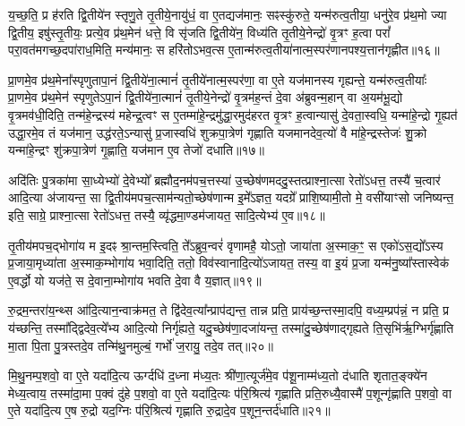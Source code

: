 य॒च्छ॒ति॒ प्र ह॑रति द्वि॒तीये॑न स्तृणु॒ते तृ॒तीये॒नायु॑धं॒ वा ए॒तद्यज॑मानः॒ सꣴस्कु॑रुते॒ यन्म॑रुत्व॒तीया॒ धनु॑रे॒व प्र॑थ॒मो ज्या द्वि॒तीय॒ इषु॑स्तृ॒तीयः॒ प्रत्ये॒व प्र॑थ॒मेन॑ धत्ते॒ वि सृ॑जति द्वि॒तीये॑न॒ विध्य॑ति तृ॒तीये॒नेन्द्रो॑ वृ॒त्रꣳ ह॒त्वा परां᳚ परा॒वत॑मगच्छ॒दपा॑राध॒मिति॒ मन्य॑मानः॒ स हरि॑तो\-ऽभव॒त्स ए॒तान्म॑रुत्व॒तीया॑नात्म॒स्पर॑णानपश्य॒त्तान॑गृह्णीत॥१६॥

प्रा॒णमे॒व प्र॑थ॒मेना᳚स्पृणुतापा॒नं द्वि॒तीये॑ना॒त्मानं॑ तृ॒तीये॑नात्म॒स्पर॑णा॒ वा ए॒ते यज॑मानस्य गृह्यन्ते॒ यन्म॑रुत्व॒तीयाः᳚ प्रा॒णमे॒व प्र॑थ॒मेन॑ स्पृणुते\-ऽपा॒नं द्वि॒तीये॑ना॒त्मानं॑ तृ॒तीये॒नेन्द्रो॑ वृ॒त्रम॑ह॒न्तं दे॒वा अ॑ब्रुवन्म॒हान् वा अ॒यम॑भू॒द्यो वृ॒त्रमव॑धी॒दिति॒ तन्म॑हे॒न्द्रस्य॑ महेन्द्र॒त्वꣳ स ए॒तम्मा॑हे॒न्द्रमु॑द्धा॒रमुद॑हरत वृ॒त्रꣳ ह॒त्वान्यासु॑ दे॒वता॒स्वधि॒ यन्मा॑हे॒न्द्रो गृ॒ह्यत॑ उद्धा॒रमे॒व तं यज॑मान॒ उद्ध॑रते॒\-ऽन्यासु॑ प्र॒जास्वधि॑ शुक्रपा॒त्रेण॑ गृह्णाति यजमानदेव॒त्यो॑ वै मा॑हे॒न्द्रस्तेजः॑ शु॒क्रो यन्मा॑हे॒न्द्रꣳ शु॑क्रपा॒त्रेण॑ गृ॒ह्णाति॒ यज॑मान ए॒व तेजो॑ दधाति॥१७॥

{\anuvakamend[{प्र॒थ॒मेना॑गृह्णीत दे॒वता᳚स्व॒ष्टाविꣳ॑शतिश्च॥५॥}]}

अदि॑तिः पु॒त्रका॑मा सा॒ध्येभ्यो॑ दे॒वेभ्यो᳚ ब्रह्मौद॒नम॑पच॒त्तस्या॑ उ॒च्छेष॑णमददु॒स्तत्प्राश्ना॒त्सा रेतो॑\-ऽधत्त॒ तस्यै॑ च॒त्वार॑ आदि॒त्या अ॑जायन्त॒ सा द्वि॒तीय॑मपच॒त्साम॑न्यतो॒च्छेष॑णान्म इ॒मे᳚\-ऽज्ञत॒ यदग्रे᳚ प्राशि॒ष्यामी॒तो मे॒ वसी॑याꣳसो जनिष्यन्त॒ इति॒ साग्रे॒ प्राश्ना॒त्सा रेतो॑\-ऽधत्त॒ तस्यै॒ व्यृ॑द्धमा॒ण्डम॑जायत॒ सादि॒त्येभ्य॑ ए॒व॥१८॥

तृ॒तीय॑मपच॒द्भोगा॑य म इ॒दꣴ श्रा॒न्तम॒स्त्विति॒ ते᳚\-ऽब्रुव॒न्वरं॑ वृणामहै॒ यो\-ऽतो॒ जाया॑ता अ॒स्माक॒ꣳ॒ स एको॑\-ऽस॒द्यो᳚\-ऽस्य प्र॒जाया॒मृध्या॑ता अ॒स्माक॒म्भोगा॑य भवा॒दिति॒ ततो॒ विव॑स्वानादि॒त्यो॑\-ऽजायत॒ तस्य॒ वा इ॒यं प्र॒जा यन्म॑नु॒ष्या᳚स्तास्वेक॑ ए॒वर्द्धो यो यज॑ते॒ स दे॒वाना॒म्भोगा॑य भवति दे॒वा वै य॒ज्ञात्॥१९॥

रु॒द्रम॒न्तरा॑य॒न्थ्स आ॑दि॒त्यान॒न्वाक्र॑मत॒ ते द्वि॑देव॒त्या᳚न्प्राप॑द्यन्त॒ तान्न प्रति॒ प्राय॑च्छ॒न्तस्मा॒दपि॒ वध्य॒म्प्रप॑न्नं॒ न प्रति॒ प्र य॑च्छन्ति॒ तस्मा᳚द्द्विदेव॒त्ये᳚भ्य आदि॒त्यो निर्गृ॑ह्यते॒ यदु॒च्छेष॑णा॒दजा॑यन्त॒ तस्मा॑दु॒च्छेष॑णाद्गृह्यते ति॒सृभि॑र्\mbox{}ऋ॒ग्भिर्गृ॑ह्णाति मा॒ता पि॒ता पु॒त्रस्तदे॒व तन्मि॑थु॒नमुल्बं॒ गर्भो॑ ज॒रायु॒ तदे॒व तत्॥२०॥

मि॒थु॒नम्प॒शवो॒ वा ए॒ते यदा॑दि॒त्य ऊर्ग्दधि॑ द॒ध्ना म॑ध्य॒तः श्री॑णा॒त्यूर्ज॑मे॒व प॑शू॒नाम्म॑ध्य॒तो द॑धाति शृतात॒ङ्क्ये॑न मेध्य॒त्वाय॒ तस्मा॑दा॒मा प॒क्वं दु॑हे प॒शवो॒ वा ए॒ते यदा॑दि॒त्यः प॑रि॒श्रित्य॑ गृह्णाति प्रति॒रुध्यै॒वास्मै॑ प॒शून्गृ॑ह्णाति प॒शवो॒ वा ए॒ते यदा॑दि॒त्य ए॒ष रु॒द्रो यद॒ग्निः प॑रि॒श्रित्य॑ गृह्णाति रु॒द्रादे॒व प॒शून॒न्तर्द॑धाति॥२१॥

